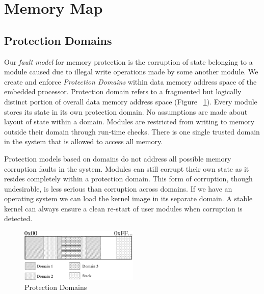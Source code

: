 \section{Memory Map}
\label{sec:memmap}
%
%
\subsection{Protection Domains}
%
Our \textit{fault model} for memory protection is the corruption of state belonging to a module caused due to illegal write operations made by some another module.
%
We create and enforce \emph{Protection Domains} within data memory address space of the embedded processor.
%
Protection domain refers to a fragmented but logically distinct portion of overall data memory address space (Figure ~\ref{fig:prot_domains}).
%
Every module stores its state in its own protection domain.
%
No assumptions are made about layout of state within a domain.
%
Modules are restricted from writing to memory outside their domain through run-time checks.
%
There is one single trusted domain in the system that is allowed to access all memory.
%

Protection models based on domains do not address all possible memory corruption faults in the system.
%
Modules can still corrupt their own state as it resides completely within a protection domain. 
%
This form of corruption, though undesirable, is less serious than corruption across domains.
%
If we have an operating system we can load the kernel image in its separate domain.
%
A stable kernel can always ensure a clean re-start of user modules when corruption is detected.
%
\begin{figure}[htbp]
   \centering
   \includegraphics[height = 1in, keepaspectratio=true]{figures/domains.pdf} 
   \caption{Protection Domains}
   \label{fig:prot_domains}
\end{figure}
%

